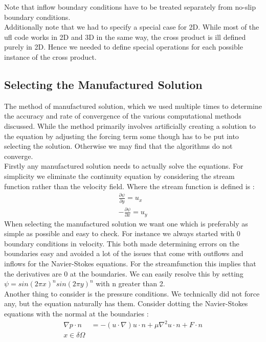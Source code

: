 \documentclass[11pt,twoside,a4paper]{article}
\begin{document}
Note that inflow boundary conditions have to be treated separately from no-slip boundary conditions.\\
Additionally note that we had to specify a special case for 2D. While most of the ufl code works in 2D and 3D in the same way, the cross product is ill defined purely in 2D. Hence we needed to define special operations for each possible instance of the cross product.\\

\subsection{Selecting the Manufactured Solution}
The method of manufactured solution, which we used multiple times to determine the accuracy and rate of convergence of the various computational methods discussed. While the method primarily involves artificially creating a solution to the equation by adjusting the forcing term some though has to be put into selecting the solution. Otherwise we may find that the algorithms do not converge.\\
Firstly any manufactured solution needs to actually solve the equations. For simplicity we eliminate the continuity equation by considering the stream function rather than the velocity field. Where the stream function is defined is :
\begin{align*}
\frac{ \partial \psi}{\partial y} = u_x \\
-\frac{\partial \psi}{\partial x} = u_y
\end{align*}
When selecting the manufactured solution we want one which is preferably as simple as possible and easy to check. For instance we always started with $0$ boundary conditions in velocity. This both made determining errors on the boundaries easy and avoided a lot of the issues that come with outflows and inflows for the Navier-Stokes equations. For the streamfunction this implies that the derivatives are 0 at the boundaries. We can easily resolve this by setting $\psi = sin(2 \pi x)^n sin(2 \pi y)^n$ with n greater than 2.\\
Another thing to consider is the pressure conditions. We technically did not force any, but the equation naturally has them. Consider dotting the Navier-Stokes equations with the normal at the boundaries :
\begin{align*}
\nabla p \cdot n &= -(u \cdot \nabla) u \cdot n  + \mu \nabla^2 u \cdot n + F \cdot n \\
x \in \delta \Omega
\end{align*}
\end{document}
